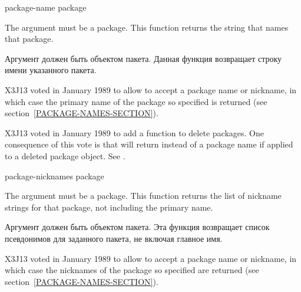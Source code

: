 \begin{defun}[Function]
package-name package

The argument must be a package.  This function returns the string that
names that package.

Аргумент должен быть объектом пакета. Данная функция возвращает строку имени
указанного пакета.

\begin{new}
X3J13 voted in January 1989
to allow  to accept a package name or nickname, in which case
the primary name of the package so specified is returned
(see section~\ref{PACKAGE-NAMES-SECTION}).
\end{new}

\begin{new}
X3J13 voted in January 1989
to add a function to delete packages.
One consequence of this vote is that 
will return  instead of a package name if applied
to a deleted package object.  See .
\end{new}
\end{defun}

\begin{defun}[Function]
package-nicknames package

The argument must be a package.  This function returns the list of
nickname strings for that package, not including the primary name.

Аргумент должен быть объектом пакета. Эта функция возвращает список псевдонимов
для заданного пакета, не включая главное имя.
\begin{new}
X3J13 voted in January 1989
to allow  to accept a package name or nickname,
in which case the nicknames of the package so specified are returned
(see section~\ref{PACKAGE-NAMES-SECTION}).
\end{new}
\end{defun}

